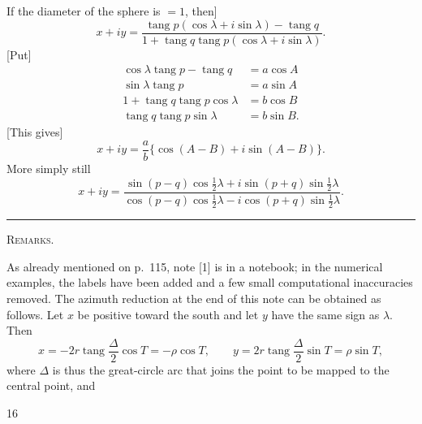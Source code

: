 If the diameter of the sphere is $=1$, then]
\[
x+iy=\frac{\operatorname{tang}p(\cos\lambda+i\sin\lambda)-\operatorname{tang}q}{1+\operatorname{tang}q\operatorname{tang}p(\cos\lambda+i\sin\lambda)}.
\]
[Put]
\[
\begin{aligned}
\cos\lambda\operatorname{tang}p-\operatorname{tang}q&=a\cos A\\
\sin\lambda\operatorname{tang}p&=a\sin A\\
1+\operatorname{tang}q\operatorname{tang}p\cos\lambda&=b\cos B\\
\operatorname{tang}q\operatorname{tang}p\sin\lambda&=b\sin B.
\end{aligned}
\]
[This gives]
\[
x+iy=\frac ab\{\cos(A-B)+i\sin(A-B)\}.
\]
More simply still
\[
x+iy=\frac{\sin(p-q)\cos\frac12\lambda+i\sin(p+q)\sin\frac12\lambda}{\cos(p-q)\cos\frac12\lambda-i\cos(p+q)\sin\frac12\lambda}.
\]
\begin{center}\rule{.18\textwidth}{.4pt}\par\vspace{10mm}\textsc{Remarks.}\end{center}
\begingroup\small
As already mentioned on p.~115, note [1] is in a notebook; in the numerical examples, the labels have been added and a few small computational inaccuracies removed. The azimuth reduction at the end of this note can be obtained as follows. Let $x$ be positive toward the south and let $y$ have the same sign as $\lambda$. Then
\[
x=-2r\operatorname{tang}\frac\Delta2\cos T=-\rho\cos T,\qquad y=2r\operatorname{tang}\frac\Delta2\sin T=\rho\sin T,
\]
where $\Delta$ is thus the great-circle arc that joins the point to be mapped to the central point, and
\par\endgroup
\vfill{}\hfill16\hspace*{2cm}\par
\endgroup
